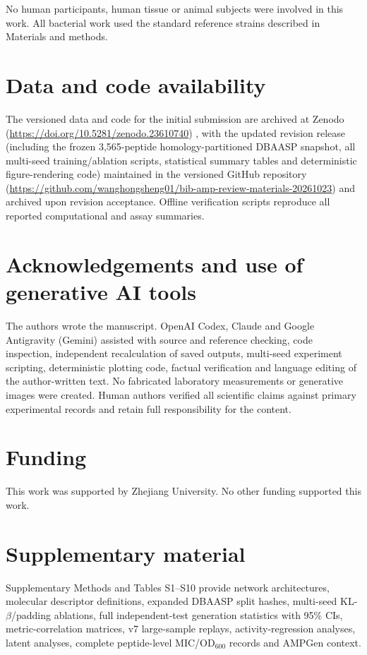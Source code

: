\documentclass[unnumsec,webpdf,contemporary,large]{oup-authoring-template}
\newcommand{\rev}[1]{#1}
\begin{document}
No human participants, human tissue or animal subjects were involved in this work. All bacterial work used the standard reference strains described in Materials and methods.

\section*{Data and code availability}
The versioned data and code for the initial submission are archived at Zenodo (\url{https://doi.org/10.5281/zenodo.23610740}) \cite{refData}, \rev{with the updated revision release (including the frozen 3,565-peptide homology-partitioned DBAASP snapshot, all multi-seed training/ablation scripts, statistical summary tables and deterministic figure-rendering code) maintained in the versioned GitHub repository (\url{https://github.com/wanghongsheng01/bib-amp-review-materials-20261023}) and archived upon revision acceptance.} Offline verification scripts reproduce all reported computational and assay summaries.

\section*{Acknowledgements and use of generative AI tools}

The authors wrote the manuscript. OpenAI Codex, Claude and \rev{Google Antigravity (Gemini)} assisted with source and reference checking, code inspection, independent recalculation of saved outputs, multi-seed experiment scripting, deterministic plotting code, factual verification and language editing of the author-written text. No fabricated laboratory measurements or generative images were created. Human authors verified all scientific claims against primary experimental records and retain full responsibility for the content.

\section*{Funding}

This work was supported by Zhejiang University. No other funding supported this work.

\section*{Supplementary material}
Supplementary Methods and Tables S1--\rev{S10} provide network architectures, molecular descriptor definitions, \rev{expanded DBAASP split hashes, multi-seed KL-$\beta$/padding ablations, full independent-test generation statistics with 95\% CIs, metric-correlation matrices, v7 large-sample replays,} activity-regression analyses, latent analyses, complete peptide-level MIC/OD$_{600}$ records and AMPGen context.
\end{document}
